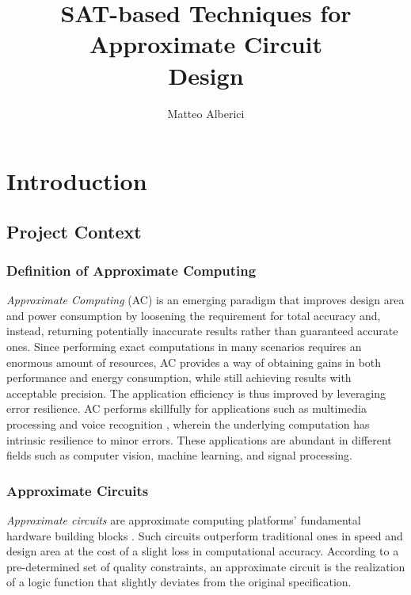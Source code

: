 \documentclass[]{usiinfbachelorproject}
\author{Matteo Alberici}
\title{SAT-based Techniques for Approximate Circuit \vspace{0.2cm}\\ Design}
\begin{document}
\maketitle
\tableofcontents

\newpage

\section{Introduction}\label{sec:introduction}

\subsection{Project Context}\label{subsec:project-context}
\subsubsection{Definition of Approximate Computing}\label{subsubsec:approximate-computing}
\textit{Approximate Computing} (AC) \cite{als} is an emerging paradigm that improves design area and power consumption by loosening the requirement for total accuracy and, instead, returning potentially inaccurate results rather than guaranteed accurate ones. Since performing exact computations in many scenarios requires an enormous amount of resources, AC \cite{acs} provides a way of obtaining gains in both performance and energy consumption, while still achieving results with acceptable precision. The application efficiency is thus improved by leveraging error resilience. AC performs skillfully for applications such as multimedia processing and voice recognition \cite{eta}, wherein the underlying computation has intrinsic resilience to minor errors. These applications are abundant in different fields such as computer vision, machine learning, and signal processing.

\subsubsection{Approximate Circuits}\label{subsubsec:approximate-circuits}
\textit{Approximate circuits} are approximate computing platforms' fundamental hardware building blocks \cite{ast}. Such circuits outperform traditional ones in speed and design area at the cost of a slight loss in computational accuracy. According to a pre-determined set of quality constraints, an approximate circuit is the realization of a logic function that slightly deviates from the original specification.
\end{document}
